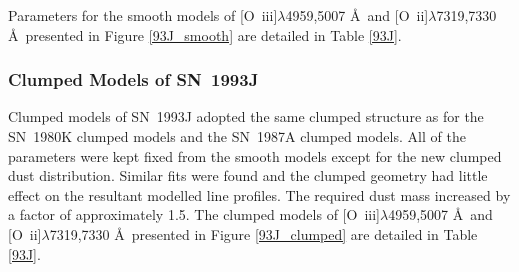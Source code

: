 Parameters for the smooth models of [O~{\sc iii}]$\lambda$4959,5007 \AA\ and [O~{\sc ii}]$\lambda$7319,7330 \AA\   presented in Figure \ref{93J_smooth} are detailed in Table \ref{93J}. 
 
\subsubsection{Clumped Models of SN~1993J}

Clumped models of SN~1993J adopted the same clumped structure as for the SN~1980K clumped models and the SN~1987A clumped models.  All of the parameters were kept fixed from the smooth models except for the new clumped dust distribution.  Similar fits were found and the clumped geometry had little effect on the resultant modelled line profiles.   The required dust mass increased by a factor of approximately 1.5.  The clumped models of [O~{\sc iii}]$\lambda$4959,5007 \AA\ and [O~{\sc ii}]$\lambda$7319,7330 \AA\   presented in Figure \ref{93J_clumped} are detailed in Table \ref{93J}. 




